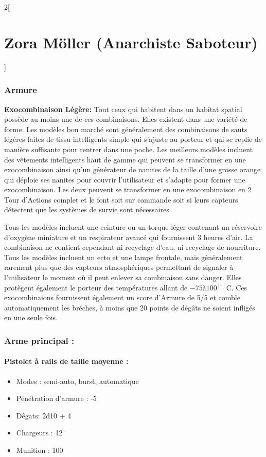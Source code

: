 \documentclass[a4paper,9pt]{article}
\begin{document}
\begin{multicols}{2}[\section*{Zora Möller (Anarchiste Saboteur)}]
   \subsubsection*{Armure}
   \textbf{Exocombinaison Légère:} Tout ceux qui habitent dans un habitat
   spatial possède au moins une de ces combinaisons. Elles existent dans une
   variété de forme. Les modèles bon marché sont généralement des combinaisons de
   sauts légères faites de tissu intelligents simple qui s'ajuste au porteur et qui
   se replie de manière suffisante pour rentrer dans une poche. Les
   meilleurs modèles incluent des vêtements intelligents haut de gamme qui peuvent
   se transformer en une exocombinaison ainsi qu'un générateur de nanites de la
   taille d'une grosse orange qui déploie ses nanites pour couvrir l'utilisateur
   et s'adapte pour former une exocombinaison. Les deux peuvent se transformer en
   une exocombinaison en 2 Tour d'Actions complet et le font soit sur commande soit
   si leurs capteurs détectent que les systèmes de survie sont nécessaires. 

   Tous les modèles incluent une ceinture ou un torque léger contenant un
   réservoire d'oxygène miniature et un respirateur avancé qui fournissent 3
   heures d'air. La combinaison ne contient cependant ni recyclage d'eau, ni
   recyclage de nourriture. Tous les modèles incluent un ecto et une
   lampe frontale, mais généralement rarement plus que des capteurs atmosphériques
   permettant de signaler à l'utilisateur le moment où il peut enlever sa
   combinaison sans danger. Elles protègent également le porteur des températures
   allant de $-75 à 100^[\circ]$C. Ces exocombinaions fournissent également un
   score d'Armure de 5/5 et comble automatiquement les brèches, à moins que 20
   points de dégâts ne soient infligés en une seule fois.

   \subsubsection*{Arme principal :}
   \paragraph{Pistolet à rails de taille moyenne :}
   \begin{itemize}
      \item Modes : semi-auto, burst, automatique
      \item Pénétration d'armure : -5
      \item Dêgats: 2d10 + 4
      \item Chargeurs : 12
      \item Munition : 100
   \end{itemize}


\end{multicols}
\end{document}
